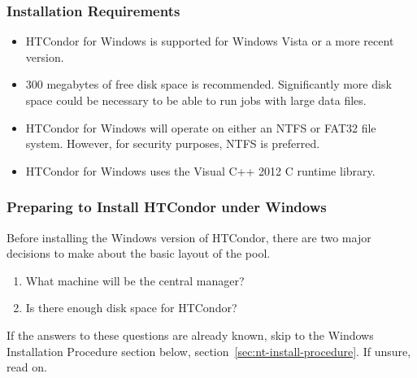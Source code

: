 \subsubsection{Installation Requirements}

\begin{itemize}

\item HTCondor for Windows is supported for Windows Vista
or a more recent version.

\item 300 megabytes of free disk space is recommended.  Significantly more 
disk space could be necessary to be able to run jobs with large data files.

\item HTCondor for Windows will operate on either an NTFS or FAT32 file system.  However, for security purposes, NTFS is preferred.

\item HTCondor for Windows uses the Visual C++ 2012 C runtime library.
\end{itemize}

\subsubsection{\label{sec:NT-Preparing-to-Install}Preparing to Install
HTCondor under Windows } 

Before installing the Windows version of HTCondor,
there are two major
decisions to make about the basic layout of the pool.

\begin{enumerate}
\item What machine will be the central manager?
\item Is there enough disk space for HTCondor?
\end{enumerate}

If the answers to these questions are already known,
skip to the Windows Installation Procedure section below,
section~\ref{sec:nt-install-procedure}.
If unsure, read on.

